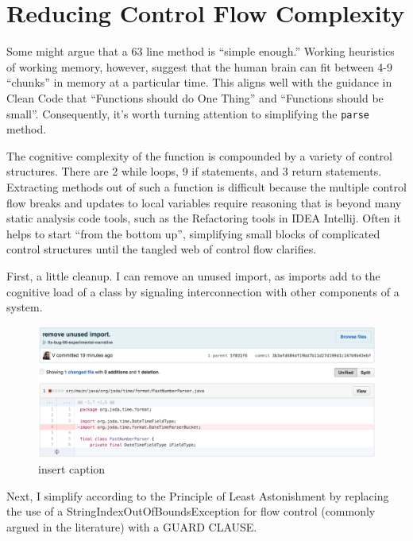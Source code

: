\section{Reducing Control Flow Complexity}

Some might argue that a 63 line method is “simple enough.”  Working heuristics of working memory, however, suggest that the human brain can fit between 4-9 “chunks” in memory at a particular time. This aligns well with the guidance in Clean Code that “Functions should do One Thing” and “Functions should be small”. Consequently, it’s worth turning attention to simplifying the \texttt{parse} method.

The cognitive complexity of the function is compounded by a variety of control structures. There are 2 while loops, 9 if statements, and 3 return statements. Extracting methods out of such a function is difficult because the multiple control flow breaks and updates to local variables require reasoning that is beyond many static analysis code tools, such as the Refactoring tools in IDEA Intellij. Often it helps to start “from the bottom up”, simplifying small blocks of complicated control structures until the tangled web of control flow clarifies.

First, a little cleanup. I can remove an unused import, as imports add to the cognitive load of a class by signaling interconnection with other components of a system.

\begin{figure}[H]
	\centering
	\includegraphics[width=\linewidth]{code12}
	\caption{insert caption}
\end{figure}

Next, I simplify according to the Principle of Least Astonishment by replacing the use of a StringIndexOutOfBoundsException for flow control (commonly argued in the literature) with a GUARD CLAUSE.

